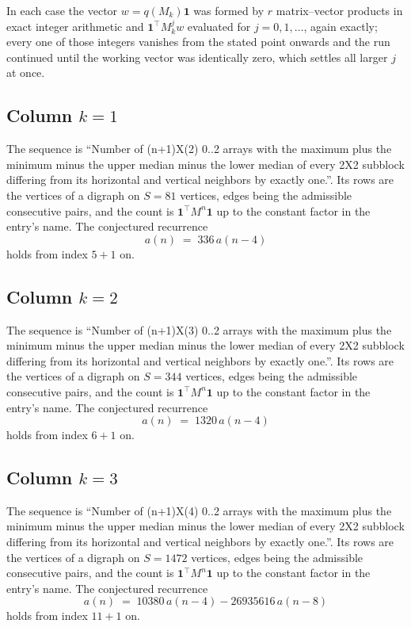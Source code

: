 \documentclass[11pt,a4paper]{article}
\theoremstyle{plain}
\theoremstyle{definition}
\begin{document}
In each case the vector $w=q(M_k)\mathbf{1}$ was formed by $r$ matrix--vector products in
exact integer arithmetic and $\mathbf{1}^{\!\top}M_k^{j}w$ evaluated for $j=0,1,\dots$,
again exactly; every one of those integers vanishes from the stated point onwards and the run
continued until the working vector was identically zero, which settles all larger $j$ at once.

\subsection*{Column $k$$=1$}
The sequence is ``Number of (n+1)X(2) 0..2 arrays with the maximum plus the minimum minus the upper median minus the lower median of every 2X2 subblock differing from its horizontal and vertical neighbors by exactly one.''. Its rows are the vertices of a digraph on
$S=81$ vertices, edges being the admissible consecutive pairs, and the count is
$\mathbf{1}^{\!\top}M^{n}\mathbf{1}$ up to the constant factor in the entry's name.
The conjectured recurrence
\[
a(n)\;=\;336\,a(n-4)
\]
holds from index $5+1$ on.

\subsection*{Column $k$$=2$}
The sequence is ``Number of (n+1)X(3) 0..2 arrays with the maximum plus the minimum minus the upper median minus the lower median of every 2X2 subblock differing from its horizontal and vertical neighbors by exactly one.''. Its rows are the vertices of a digraph on
$S=344$ vertices, edges being the admissible consecutive pairs, and the count is
$\mathbf{1}^{\!\top}M^{n}\mathbf{1}$ up to the constant factor in the entry's name.
The conjectured recurrence
\[
a(n)\;=\;1320\,a(n-4)
\]
holds from index $6+1$ on.

\subsection*{Column $k$$=3$}
The sequence is ``Number of (n+1)X(4) 0..2 arrays with the maximum plus the minimum minus the upper median minus the lower median of every 2X2 subblock differing from its horizontal and vertical neighbors by exactly one.''. Its rows are the vertices of a digraph on
$S=1472$ vertices, edges being the admissible consecutive pairs, and the count is
$\mathbf{1}^{\!\top}M^{n}\mathbf{1}$ up to the constant factor in the entry's name.
The conjectured recurrence
\[
a(n)\;=\;10380\,a(n-4) - 26935616\,a(n-8)
\]
holds from index $11+1$ on.
\end{document}
